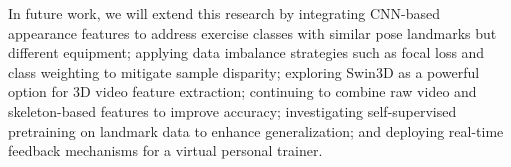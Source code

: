 \documentclass[journal,onecolumn, 11pt]{IEEEtran}
\begin{document}
In future work, we will extend this research by integrating CNN-based appearance features to address exercise classes with similar pose landmarks but different equipment; applying data imbalance strategies such as focal loss and class weighting to mitigate sample disparity; exploring Swin3D as a powerful option for 3D video feature extraction; continuing to combine raw video and skeleton-based features to improve accuracy; investigating self-supervised pretraining on landmark data to enhance generalization; and deploying real-time feedback mechanisms for a virtual personal trainer.









\end{document}
